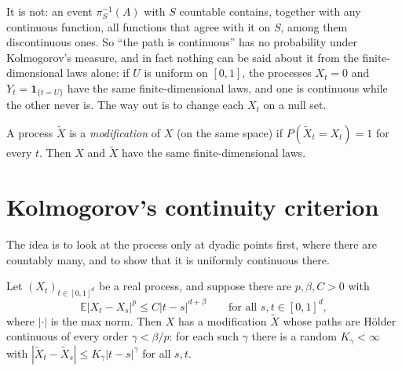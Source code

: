 It is not: an event $\pi_S^{-1}(A)$ with $S$ countable contains, together with any continuous function, all functions that agree with it on $S$, among them discontinuous ones. So ``the path is
continuous'' has no probability under Kolmogorov's measure, and in fact nothing can be said about it from the finite-dimensional laws alone: if $U$ is uniform on $[0,1]$, the processes
$X_t=0$ and $Y_t=\mathbf 1_{\{t=U\}}$ have the same finite-dimensional laws, and one is continuous while the other never is. The way out is to change each $X_t$ on a null set.

\begin{definition}\label{def:modification}
A process $\tilde X$ is a \emph{modification} of $X$ (on the same space) if $P(\tilde X_t=X_t)=1$ for every $t$. Then $X$ and $\tilde X$ have the same finite-dimensional laws.
\end{definition}

\section{Kolmogorov's continuity criterion}

The idea is to look at the process only at dyadic points first, where there are countably many, and to show that it is uniformly continuous there.

\begin{theorem}\label{thm:kolmcont}
Let $(X_t)_{t\in[0,1]^d}$ be a real process, and suppose there are $p,\beta,C>0$ with
\[
\mathbb E|X_t-X_s|^p\le C|t-s|^{d+\beta}\qquad\text{for all }s,t\in[0,1]^d,
\]
where $|\cdot|$ is the max norm. Then $X$ has a modification $\tilde X$ whose paths are H\"older continuous of every order $\gamma<\beta/p$: for each such $\gamma$ there is a random $K_\gamma<\infty$ with
$|\tilde X_t-\tilde X_s|\le K_\gamma|t-s|^\gamma$ for all $s,t$.
\end{theorem}

